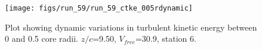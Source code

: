 \begin{figure}[H]
\centering
\texttt{[image: figs/run\_59/run\_59\_ctke\_005rdynamic]}
\caption{Plot showing dynamic variations in turbulent kinetic energy between 0 and 0.5 core radii. $z/c$=9.50, $V_{free}$=30.9, station 6.}
\end{figure}


